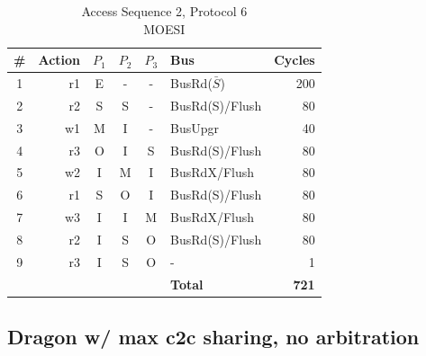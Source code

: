 \documentclass[12pt, letterpaper]{report}
\begin{document}
\begin{table}[H]
	\setlength{\extrarowheight}{.5ex}
	\centering
	\begin{tabular}{ |c|r|c|c|c|l|r| }
		\hline
		\textbf{\#} & \textbf{Action} & \textbf{$P_1$} & \textbf{$P_{2}$} & \textbf{$P_3$} & \textbf{Bus} & \textbf{Cycles} \\
		\hline
		1 & r1 & E & - & - & BusRd($\bar{S}$) & 200 \\
		\hline
		2 & r2 & S & S & - & BusRd(S)/Flush & 80 \\
		\hline
		3 & w1 & M & I & - & BusUpgr & 40 \\
		\hline
		4 & r3 & O & I & S & BusRd(S)/Flush & 80 \\
		\hline
		5 & w2 & I & M & I & BusRdX/Flush & 80 \\
		\hline
		6 & r1 & S & O & I & BusRd(S)/Flush & 80 \\
		\hline
		7 & w3 & I & I & M & BusRdX/Flush & 80 \\
		\hline
		8 & r2 & I & S & O & BusRd(S)/Flush & 80 \\
		\hline
		9 & r3 & I & S & O & - & 1 \\
		\hline \hline \hline
		\cellcolor{null} & \cellcolor{null} & \cellcolor{null} & \cellcolor{null} & \cellcolor{null} & \textbf{Total} & \textbf{721} \\
		\hline
	\end{tabular}
	\caption{Access Sequence 2, Protocol 6\\MOESI}
\end{table}



\subsection{Dragon w/ max c2c sharing, no arbitration}
\end{document}
